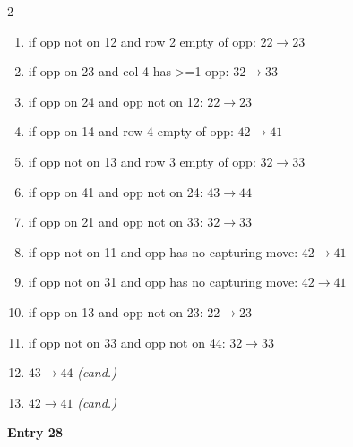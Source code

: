 \begin{multicols}{2}
\begin{tikzpicture}[scale=0.24]
\end{tikzpicture}
\nopagebreak\begin{enumerate}[topsep=1pt,itemsep=0pt,parsep=0pt,leftmargin=2.2em,label=\arabic*.]
\item if opp not on 12 and row 2 empty of opp: $22\!\to\!23$
\item if opp on 23 and col 4 has >=1 opp: $32\!\to\!33$
\item if opp on 24 and opp not on 12: $22\!\to\!23$
\item if opp on 14 and row 4 empty of opp: $42\!\to\!41$
\item if opp not on 13 and row 3 empty of opp: $32\!\to\!33$
\item if opp on 41 and opp not on 24: $43\!\to\!44$
\item if opp on 21 and opp not on 33: $32\!\to\!33$
\item if opp not on 11 and opp has no capturing move: $42\!\to\!41$
\item if opp not on 31 and opp has no capturing move: $42\!\to\!41$
\item if opp on 13 and opp not on 23: $22\!\to\!23$
\item if opp not on 33 and opp not on 44: $32\!\to\!33$
\item $43\!\to\!44$ \hfill\textit{(cand.)}
\item $42\!\to\!41$ \hfill\textit{(cand.)}
\end{enumerate}\smallskip
\noindent\textbf{Entry 28} \; 
\end{multicols}
